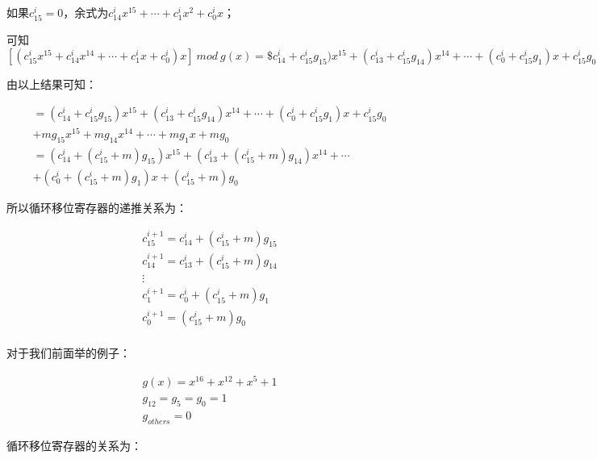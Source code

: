 \documentclass[
]{article}
\begin{document}
如果$c_{15}^i=0$，余式为$c_{14}^ix^{15}+\cdots+c_1^ix^2+c_0^ix$；

可知$[(c_{15}^ix^{15}+c_{14}^ix^{14}+\cdots+c_1^ix+c_0^i)x] \: mod \: g(x)=\$c_{14}^i+c_{15}^ig_{15})x^{15}+(c_{13}^i+c_{15}^ig_{14})x^{14}+\cdots+(c_0^i+c_{15}^ig_1)x+c_{15}^ig_0$

由以上结果可知：

\begin{equation}
\begin{aligned}
=(c_{14}^i+c_{15}^ig_{15})x^{15}+(c_{13}^i+c_{15}^ig_{14})x^{14}+\cdots+(c_0^i+c_{15}^ig_1)x+c_{15}^ig_0\\+mg_{15}x^{15}+mg_{14}x^{14}+\cdots+mg_1x+mg_0\\
=(c_{14}^{i}+(c_{15}^i+m)g_{15})x^{15}+(c_{13}^{i}+(c_{15}^i+m)g_{14})x^{14}+\cdots\\+(c_{0}^{i}+(c_{15}^i+m)g_{1})x+(c_{15}^i+m)g_0
\end{aligned}
\end{equation}

所以循环移位寄存器的递推关系为：

\begin{equation}
\begin{aligned}
c_{15}^{i+1}=c_{14}^{i}+(c_{15}^i+m)g_{15}\\
c_{14}^{i+1}=c_{13}^{i}+(c_{15}^i+m)g_{14}\\
\vdots\\
c_{1}^{i+1}=c_{0}^{i}+(c_{15}^i+m)g_{1}\\
c_{0}^{i+1}=(c_{15}^i+m)g_{0}\\
\end{aligned}
\end{equation}

对于我们前面举的例子：

\begin{equation}
\begin{aligned}
g(x)=x^{16}+x^{12}+x^5+1\\
g_{12}=g_{5}=g_{0}=1\\
g_{others}=0
\end{aligned}
\end{equation}

循环移位寄存器的关系为：
\end{document}
